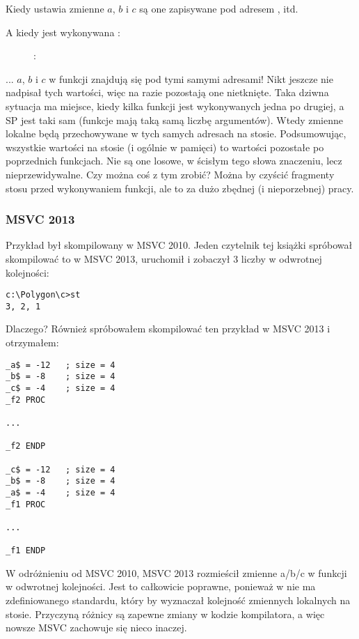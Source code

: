 Kiedy  ustawia zmienne $a$, $b$ i $c$ są one zapisywane pod adresem , itd.

\clearpage
A kiedy jest wykonywana :

\begin{figure}[H]
\centering
{}
\caption{\olly: }
\label{fig:stack_noise_olly2}
\end{figure}

... $a$, $b$ i $c$ w funkcji  znajdują się pod tymi samymi adresami!
Nikt jeszcze nie nadpisał tych wartości, więc na razie pozostają one nietknięte.
Taka dziwna sytuacja ma miejsce, kiedy kilka funkcji jest wykonywanych jedna po drugiej,
a \ac{SP} jest taki sam (funkcje mają taką samą liczbę argumentów).
Wtedy zmienne lokalne będą przechowywane w tych samych adresach na stosie.
Podsumowując, wszystkie wartości na stosie (i ogólnie w pamięci) to wartości pozostałe po poprzednich funkcjach.
Nie są one losowe, w ścisłym tego słowa znaczeniu, lecz nieprzewidywalne.
Czy można coś z tym zrobić?
Można by czyścić fragmenty stosu przed wykonywaniem funkcji, ale to za dużo zbędnej (i nieporzebnej) pracy.

\subsubsection{MSVC 2013}

Przykład był skompilowany w MSVC 2010.
Jeden czytelnik tej książki spróbował skompilować to w MSVC 2013, uruchomił i zobaczył 3 liczby w odwrotnej kolejności:

\begin{lstlisting}
c:\Polygon\c>st
3, 2, 1
\end{lstlisting}

Dlaczego?
Również spróbowałem skompilować ten przykład w MSVC 2013 i otrzymałem:

\begin{lstlisting}[caption=MSVC 2013,style=customasmx86]
_a$ = -12	; size = 4
_b$ = -8	; size = 4
_c$ = -4	; size = 4
_f2	PROC

...

_f2	ENDP

_c$ = -12	; size = 4
_b$ = -8	; size = 4
_a$ = -4	; size = 4
_f1	PROC

...

_f1	ENDP
\end{lstlisting}

W odróżnieniu od MSVC 2010, MSVC 2013 rozmieścił zmienne a/b/c w funkcji  w odwrotnej kolejności.
Jest to całkowicie poprawne, ponieważ w \CCpp nie ma zdefiniowanego standardu, który by wyznaczał kolejność zmiennych lokalnych na stosie.
Przyczyną różnicy są zapewne zmiany w kodzie kompilatora, a więc nowsze MSVC zachowuje się nieco inaczej.


